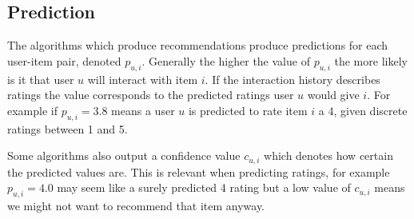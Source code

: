
\subsection{Prediction}\label{sec:background:theory:pred}

The algorithms which produce recommendations produce predictions for each user-item pair, denoted $p_{u, i}$. Generally the higher the value of $p_{u, i}$ the more likely is it that user $u$ will interact with item $i$. If the interaction history describes ratings the value corresponds to the predicted ratings user $u$ would give $i$. For example if $p_{u, i} = 3.8$ means a user $u$ is predicted to rate item $i$ a 4, given discrete ratings between 1 and 5.

Some algorithms also output a confidence value $c_{u, i}$ which denotes how certain the predicted values are. This is relevant when predicting ratings, for example $p_{u, i} = 4.0$ may seem like a surely predicted 4 rating but a low value of $c_{u, i}$ means we might not want to recommend that item anyway.
